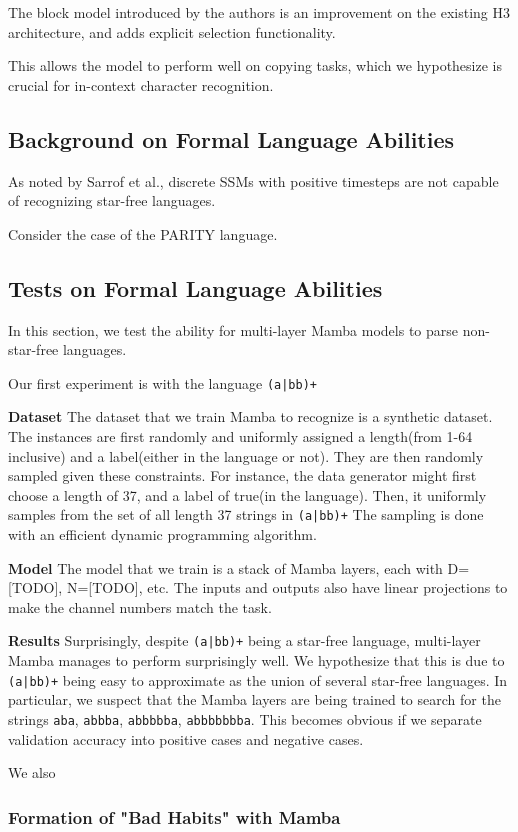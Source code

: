 The block model introduced by the authors is an improvement on the existing
H3\cite{h3} architecture, and adds explicit selection functionality.

This allows the model to perform well on copying tasks, which we hypothesize
is crucial for in-context character recognition.

\subsection{Background on Formal Language Abilities}
As noted by Sarrof et al.\cite{ssmformal}, discrete SSMs with positive timesteps
are not capable of recognizing star-free languages.

Consider the case of the PARITY language.




\subsection{Tests on Formal Language Abilities}
In this section, we test the ability for multi-layer Mamba models to parse
non-star-free languages.

Our first experiment is with the language \texttt{(a|bb)+}

\textbf{Dataset} The dataset that we train Mamba to recognize is a synthetic
dataset.
The instances are first randomly and uniformly assigned a length(from 1-64
inclusive) and a label(either in the language or not).
They are then randomly sampled given these constraints.
For instance, the data generator might first choose a length of 37, and a label
of true(in the language).
Then, it uniformly samples from the set of all length 37 strings in
\texttt{(a|bb)+}
The sampling is done with an efficient dynamic programming algorithm.

\textbf{Model} The model that we train is a stack of Mamba layers, each with 
D=[TODO], N=[TODO], etc.
The inputs and outputs also have linear projections to make the channel numbers
match the task.

\textbf{Results} Surprisingly, despite \texttt{(a|bb)+} being a star-free
language, multi-layer Mamba manages to perform surprisingly well.
We hypothesize that this is due to \texttt{(a|bb)+} being easy to approximate
as the union of several star-free languages.
% 
In particular, we suspect that the Mamba layers are being trained to search for
the strings \texttt{aba}, \texttt{abbba}, \texttt{abbbbba}, \texttt{abbbbbbba}.
This becomes obvious if we separate validation accuracy into positive cases and
negative cases.

We also 

\subsubsection{Formation of "Bad Habits" with Mamba}

